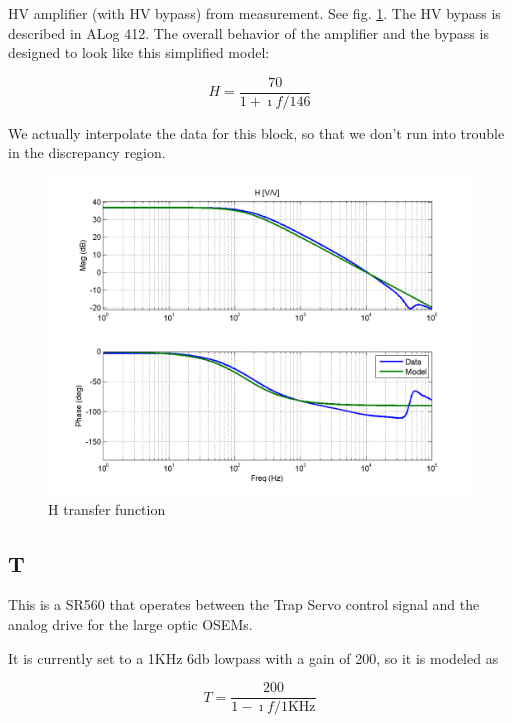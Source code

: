 HV amplifier (with HV bypass) from measurement. See fig. \ref{fig:H}. The HV bypass is described in ALog 412.  The overall behavior of the amplifier and the bypass is designed to look like this simplified model:

\begin{equation}
H = \frac{70}{1+\imath f/146}
\label{eq:Hmodel}
\end{equation}

We actually interpolate the data for this block, so that we don't run into trouble in the discrepancy region.


\begin{figure}[htbp]
\includegraphics[width=\columnwidth]{figures/controls/H.png}%
\caption{H transfer function}%
\label{fig:H}%
\end{figure}


\subsection{T}

This is a SR560 that operates between the Trap Servo control signal and the analog drive for the large optic OSEMs.

It is currently set to a 1KHz 6db lowpass with a gain of 200, so it is modeled as 

\begin{equation}
T = \frac{200}{1 - \imath f/1\mbox{KHz}}
\label{eq:T}
\end{equation}						




